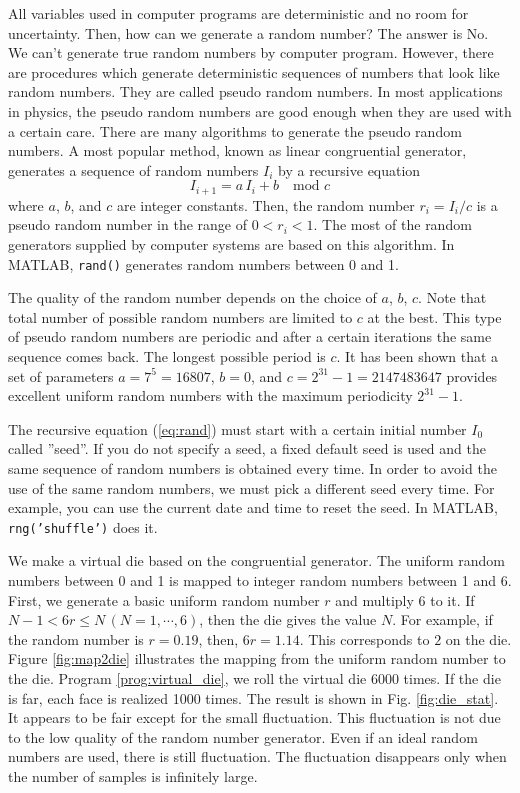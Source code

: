 All variables used in computer programs are deterministic and no room for uncertainty.  Then, how can we generate a random number?  The answer is No. We can't generate true random numbers by computer program.  However, there are procedures which generate deterministic sequences of numbers that look like random numbers.  They are called pseudo random numbers.  In most applications in physics, the pseudo random numbers are good enough when they are used with a certain care.  There are many algorithms to generate the pseudo random numbers.  A most popular method, known as linear congruential generator,  generates a sequence of random numbers $I_i$ by a recursive equation
\begin{equation}\label{eq:rand}
I_{i+1} = a\, I_i + b\quad \text{mod } c
\end{equation}
where $a$, $b$, and $c$ are integer constants. Then, the random number $r_i = I_i/c$ is a pseudo random number in the range of $0<r_i<1$. 
The most of the random generators supplied by computer systems are based on this algorithm.  In MATLAB, \texttt{rand()} generates random numbers between 0 and 1.
 
The quality of the random number depends on the choice of $a$, $b$, $c$.  Note that total number of possible random numbers are limited to $c$ at the best.  This type of pseudo random numbers are periodic and after a certain iterations the same sequence comes back. The longest possible period is $c$. It has been shown that a set of parameters $a=7^5=16807$, $b=0$, and $c=2^{31}-1=2147483647$ provides excellent uniform random numbers with the maximum periodicity $2^{31}-1$.
 
The recursive equation (\ref{eq:rand}) must start with a certain initial number $I_0$ called ''seed''. If you do not specify a seed, a fixed default seed is used and the same sequence of random numbers is obtained every time.  In order to avoid the use of the same random numbers, we must pick a different seed every time. For example, you can use the current date and time to reset the seed.  In MATLAB, \texttt{rng('shuffle')} does it.

 
\begin{example}

\medskip
\noindent
We make a virtual die based on the congruential generator.  The uniform random numbers between 0 and 1 is mapped to integer random numbers between 1 and 6.
First, we generate a basic uniform random number $r$ and multiply 6 to it.  If $N-1 < 6 r \leq N \,( N=1,\cdots, 6)$, then the die gives the value $N$. For example, if the random number is $r=0.19$, then, $6r= 1.14$.  This corresponds to $2$ on the die. Figure \ref{fig:map2die} illustrates the mapping from the uniform random number to the die. Program \ref{prog:virtual_die}, we roll the virtual die 6000 times. If the die is far, each face is realized 1000 times.  The result is shown in Fig. \ref{fig:die_stat}.  It appears to be fair except for the small fluctuation.  This fluctuation is not due to the low quality of the random number generator.  Even if  an ideal random numbers are used, there is still fluctuation.  The fluctuation disappears only when the number of samples is infinitely large.
\end{example}

